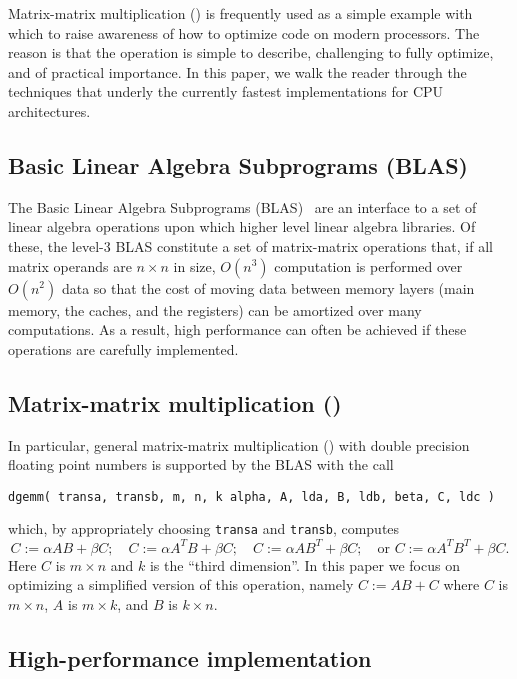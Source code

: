Matrix-matrix multiplication (\Gemm) is frequently used as a simple example with which to raise awareness of how to optimize code on modern processors.  The reason is that the operation is simple to describe, challenging to fully optimize, and of practical importance.  In this paper, we walk the reader through the techniques that underly the currently fastest implementations for CPU architectures.

\subsection{Basic Linear Algebra Subprograms (BLAS)}

The Basic Linear Algebra Subprograms (BLAS)~\cite{BLAS1,BLAS2,BLAS3,BLIS-Encycl} are an interface to a set of linear algebra operations upon which higher level linear algebra libraries.  Of these, the level-3 BLAS constitute a set of matrix-matrix operations that, if all matrix operands are $ n \times n$ in size, $ O( n^3 ) $ computation is performed over $ O( n^2 ) $ data so that the cost of moving data between memory layers (main memory, the caches, and the registers) can be amortized over many computations.  As a result, high performance can often be achieved if these operations are carefully implemented.

\subsection{Matrix-matrix multiplication (\Gemm)}

In particular, general matrix-matrix multiplication (\Gemm) with double precision floating point numbers is supported by the BLAS with the call
\begin{center}
	\tt dgemm( transa, transb, m, n, k alpha, A, lda, B, ldb, beta, C, ldc )
\end{center}
which, by appropriately choosing {\tt transa} and {\tt transb}, 
computes 
\[
C := \alpha A B + \beta C; \quad
C := \alpha A^T B + \beta C; \quad
C := \alpha A B^T + \beta C; \quad \mbox{or }
C := \alpha A^T B^T + \beta C.
\]
Here $ C $ is $ m \times n $ and $ k $ is the ``third dimension''.
In this paper we focus on optimizing a simplified version of this operation, namely $ C := A B + C $ where $ C $ is $ m \times n $, 
$ A $ is $ m \times k $, and $ B $ is $ k \times n $.

\subsection{High-performance implementation}

